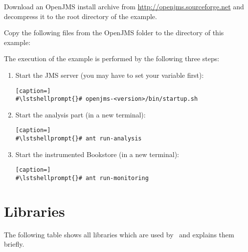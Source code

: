 \begin{compactenum}\setcounter{enumi}{2}
\item Download an OpenJMS install archive from \url{http://openjms.sourceforge.net} %
and decompress it to the root directory of the example. 
\item Copy the following files from the OpenJMS  folder to the  directory 
   of this example:
\begin{compactenum}
\item {}
\item {}
\item {}
\item {}
\item {}
\item {}
\end{compactenum}
\end{compactenum}

\enlargethispage{2cm}

 The execution of the example is performed by the following three steps:
\begin{enumerate}
\item Start the JMS server (you may have to set your  variable first):

\setBashListing
\begin{lstlisting}[caption=]
#\lstshellprompt{}# openjms-<version>/bin/startup.sh
\end{lstlisting}
\item Start the analysis part (in a new terminal):
\setBashListing
\begin{lstlisting}[caption=]
#\lstshellprompt{}# ant run-analysis
\end{lstlisting}
\item Start the instrumented Bookstore (in a new terminal):
\setBashListing
\begin{lstlisting}[caption=]
#\lstshellprompt{}# ant run-monitoring
\end{lstlisting}
\end{enumerate}

\chapter{Libraries}
    The following table shows all libraries which are used by \Kieker\ and explains them briefly.
    

